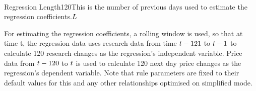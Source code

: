 \documentclass{article}%
\begin{document}
{\\
\vspace{1mm}
\fixedruleparameters
{Regression Length}{120}{This is the number of previous days used to estimate the regression coefficients.}{$L$}%
\stoptable 

\vspace{1mm}
\justify For estimating the regression coefficients, a rolling window is used, so that at time t, the
regression data uses research data from time $t - 121$ to $t - 1$ to calculate 120 research changes as the regression’s independent variable. Price data from $t - 120$ to $t$ is used to calculate 120 next day price changes as the regression’s dependent variable. 
\vspace{1mm}
\justify Note that rule parameters are fixed to their default values for this and any other relationships optimised on simplified mode.

} %



\assumptions%
\keyterms%
\furtherlinks%

\appendixinfertrade{

\vspace{1mm}

\regressionanderrorpartone

}
\end{document}
